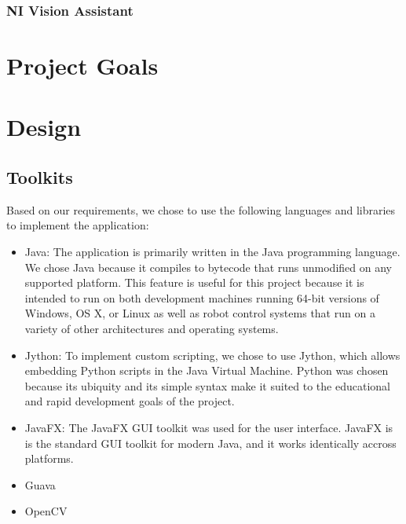 \documentclass[12pt]{article}
\begin{document}
\subsubsection{NI Vision Assistant}


\section{Project Goals}


\section{Design}



\subsection{Toolkits}
Based on our requirements, we chose to use the following languages and libraries to implement the application:
\begin{itemize}
    \item Java: The application is primarily written in the Java programming language.  We chose Java because it compiles to bytecode that runs unmodified on any supported platform.  This feature is useful for this project because it is intended to run on both development machines running 64-bit versions of Windows, OS X, or Linux as well as robot control systems that run on a variety of other architectures and operating systems.
    \item Jython: To implement custom scripting, we chose to use Jython, which allows embedding Python scripts in the Java Virtual Machine.  Python was chosen because its ubiquity and its simple syntax make it suited to the educational and rapid development goals of the project.
    \item JavaFX: The JavaFX GUI toolkit was used for the user interface.  JavaFX is is the standard GUI toolkit for modern Java, and it works identically accross platforms.
    \item Guava
    \item OpenCV
\end{itemize}
\end{document}
